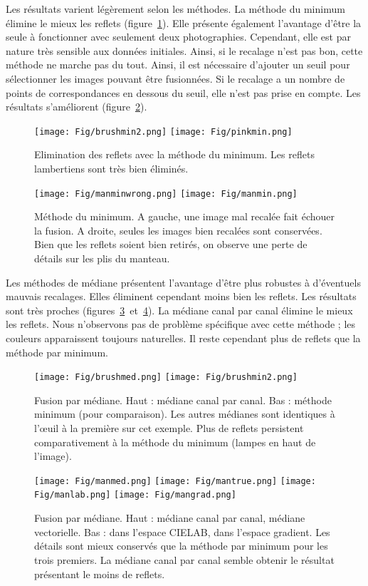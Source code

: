 \documentclass[12pt,a4paper]{article}
\begin{document}
Les résultats varient légèrement selon les méthodes. La méthode du minimum élimine le mieux les reflets (figure~\ref{brushmin}). Elle présente également l'avantage d'être la seule à fonctionner avec seulement deux photographies. Cependant, elle est par nature très sensible aux données initiales. Ainsi, si le recalage n'est pas bon, cette méthode ne marche pas du tout. Ainsi, il est nécessaire d'ajouter un seuil pour sélectionner les images pouvant être fusionnées. Si le recalage a un nombre de points de correspondances en dessous du seuil, elle n'est pas prise en compte. Les résultats s'améliorent (figure~\ref{manmin}). \\
\label{results}
\begin{figure}
\centering
\texttt{[image: Fig/brushmin2.png]}
\texttt{[image: Fig/pinkmin.png]}
\caption{Elimination des reflets avec la méthode du minimum. Les reflets lambertiens sont très bien éliminés.}
\label{brushmin}
\end{figure}
\begin{figure}
\centering
\texttt{[image: Fig/manminwrong.png]}
\texttt{[image: Fig/manmin.png]}
\caption{Méthode du minimum. A gauche, une image mal recalée fait échouer la fusion. A droite, seules les images bien recalées sont conservées. Bien que les reflets soient bien retirés, on observe une perte de détails sur les plis du manteau.}
\label{manmin}
\end{figure}
Les méthodes de médiane présentent l'avantage d'être plus robustes à d'éventuels mauvais recalages. Elles éliminent cependant moins bien les reflets. Les résultats sont très proches (figures~\ref{med1}~et~\ref{med2}). La médiane canal par canal élimine le mieux les reflets. Nous n'observons pas de problème spécifique avec cette méthode ; les couleurs apparaissent toujours naturelles. Il reste cependant plus de reflets que la méthode par minimum.
\begin{figure}[h]
\centering
\texttt{[image: Fig/brushmed.png]}
\texttt{[image: Fig/brushmin2.png]}
\caption{Fusion par médiane. Haut : médiane canal par canal. Bas : méthode minimum (pour comparaison). Les autres médianes sont identiques à l'œuil à la première sur cet exemple. Plus de reflets persistent comparativement à la méthode du minimum (lampes en haut de l'image).}
\label{med1}
\end{figure}
\begin{figure}[h]
\centering
\texttt{[image: Fig/manmed.png]}
\texttt{[image: Fig/mantrue.png]}
\texttt{[image: Fig/manlab.png]}
\texttt{[image: Fig/mangrad.png]}
\caption{Fusion par médiane. Haut : médiane canal par canal, médiane vectorielle. Bas : dans l'espace CIELAB, dans l'espace gradient. Les détails sont mieux conservés que la méthode par minimum pour les trois premiers. La médiane canal par canal semble obtenir le résultat présentant le moins de reflets.}
\label{med2}
\end{figure}
\end{document}
